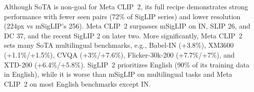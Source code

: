 Although SoTA is non-goal for Meta CLIP~2, its full recipe
demonstrates strong performance
with fewer seen pairs (72\% of SigLIP series) and lower resolution (224px vs mSigLIP's 256). Meta CLIP~2 surpasses mSigLIP on IN, SLIP 26, and DC 37, and the recent SigLIP 2 on later two. More significantly, Meta CLIP~2 sets many SoTA multilingual benchmarks, e.g., Babel-IN (+3.8\%), XM3600 (+1.1\%/+1.5\%), CVQA (+3\%/+7.6\%), Flicker-30k-200 (+7.7\%/+7\%), and XTD-200 (+6.4\%/+5.8\%). SigLIP~2 prioritizes English (90\% of its training data in English), while it is worse than mSigLIP on multilingual tasks and Meta CLIP~2 on most English benchmarks except IN.

\begin{table}[h]
\centering
\small
{}
\vspace{1.5mm}
\caption{Ablation study of metadata and alt-texts combination on ViT-B/32 using English 1.0$\times$ and Worldwide 1.0$\times$ with mT5 multilingual tokenizer. $t_\text{lang}$ is the count thresholds for each language and $t_\text{en}$ for English.}
\label{tbl:ablation_metadata_curation}
\end{table}
\vspace{-3.mm}

